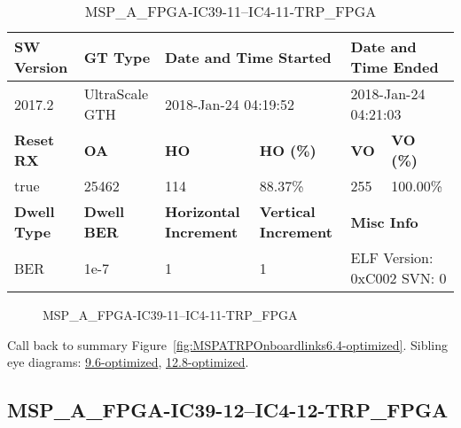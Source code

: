 \begin{table}[h]
\centering
\caption{MSP\_A\_FPGA-IC39-11--IC4-11-TRP\_FPGA}
\label{tab:MSPAFPGAIC3911IC411TRPFPGA6.4-optimized}
\begin{tabular}{@{}|l|l|l|l|l|l|@{}}
\toprule
\textbf{SW Version}                & \textbf{GT Type}   & \multicolumn{2}{l|}{\textbf{Date and Time Started}}            & \multicolumn{2}{l|}{\textbf{Date and Time Ended}}        \\ \midrule
2017.2                       & UltraScale GTH          & \multicolumn{2}{l|}{2018-Jan-24 04:19:52}                   & \multicolumn{2}{l|}{2018-Jan-24 04:21:03}               \\ \midrule
\textbf{Reset RX}                  & \textbf{OA} & \textbf{HO}   & \textbf{HO (\%)} & \textbf{VO} & \textbf{VO (\%)} \\ \midrule
true & 25462        & 114          & 88.37\%        & 255        & 100.00\%       \\ \midrule
\textbf{Dwell Type}                & \textbf{Dwell BER} & \textbf{Horizontal Increment} & \textbf{Vertical Increment}    & \multicolumn{2}{l|}{\textbf{Misc Info}}                  \\ \midrule
BER                            & 1e-7        & 1        & 1           & \multicolumn{2}{l|}{ELF Version: 0xC002 SVN: 0}                         \\ \bottomrule
\end{tabular}
\end{table}

\begin{figure}[h]
\caption{MSP\_A\_FPGA-IC39-11--IC4-11-TRP\_FPGA} \label{fig:MSPAFPGAIC3911IC411TRPFPGA6.4-optimized}
\end{figure}

Call back to summary Figure~\ref{fig:MSPATRPOnboardlinks6.4-optimized}.
Sibling eye diagrams: \hyperref[sec:MSPAFPGAIC3911IC411TRPFPGA9.6-optimized]{9.6-optimized}, \hyperref[sec:MSPAFPGAIC3911IC411TRPFPGA12.8-optimized]{12.8-optimized}.

\clearpage
\newpage


\subsection{MSP\_A\_FPGA-IC39-12--IC4-12-TRP\_FPGA}\label{sec:MSPAFPGAIC3912IC412TRPFPGA6.4-optimized}

